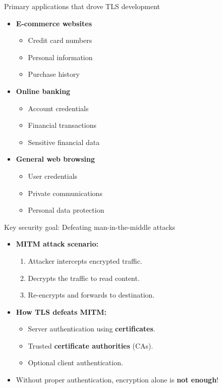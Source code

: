 \documentclass[aspectratio=169, lualatex, handout]{beamer}
\begin{document}
\begin{frame}{Primary applications that drove TLS development}
	\begin{itemize}[<+->]
		\item \textbf{E-commerce websites}
		      \begin{itemize}
			      \item Credit card numbers
			      \item Personal information
			      \item Purchase history
		      \end{itemize}
		\item \textbf{Online banking}
		      \begin{itemize}
			      \item Account credentials
			      \item Financial transactions
			      \item Sensitive financial data
		      \end{itemize}
		\item \textbf{General web browsing}
		      \begin{itemize}
			      \item User credentials
			      \item Private communications
			      \item Personal data protection
		      \end{itemize}
	\end{itemize}
\end{frame}

\begin{frame}{Key security goal: Defeating man-in-the-middle attacks}
	\begin{itemize}[<+->]
		\item \textbf{MITM attack scenario:}
		      \begin{enumerate}
			      \item Attacker intercepts encrypted traffic.
			      \item Decrypts the traffic to read content.
			      \item Re-encrypts and forwards to destination.
		      \end{enumerate}
		\item \textbf{How TLS defeats MITM:}
		      \begin{itemize}
			      \item Server authentication using \textbf{certificates}.
			      \item Trusted \textbf{certificate authorities} (CAs).
			      \item Optional client authentication.
		      \end{itemize}
		\item Without proper authentication, encryption alone is \textbf{not enough}!
	\end{itemize}
\end{frame}
\end{document}
